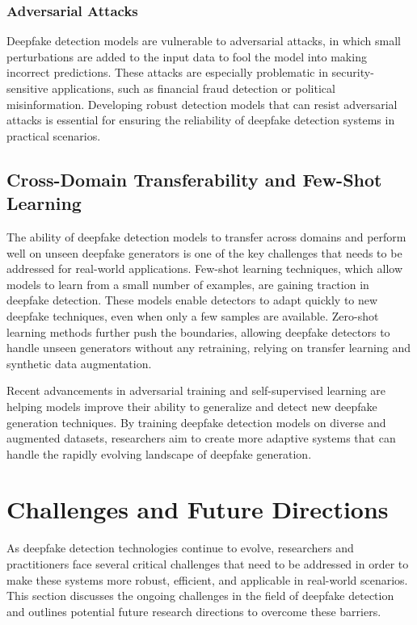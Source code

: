 \documentclass[lettersize,journal]{IEEEtran}
\begin{document}
\subsubsection{Adversarial Attacks}

Deepfake detection models are vulnerable to adversarial attacks, in which small perturbations are added to the input data to fool the model into making incorrect predictions. These attacks are especially problematic in security-sensitive applications, such as financial fraud detection or political misinformation. Developing robust detection models that can resist adversarial attacks is essential for ensuring the reliability of deepfake detection systems in practical scenarios.


\subsection{Cross-Domain Transferability and Few-Shot Learning}

The ability of deepfake detection models to transfer across domains and perform well on unseen deepfake generators is one of the key challenges that needs to be addressed for real-world applications. Few-shot learning techniques, which allow models to learn from a small number of examples, are gaining traction in deepfake detection. These models enable detectors to adapt quickly to new deepfake techniques, even when only a few samples are available. Zero-shot learning methods further push the boundaries, allowing deepfake detectors to handle unseen generators without any retraining, relying on transfer learning and synthetic data augmentation.

Recent advancements in adversarial training and self-supervised learning are helping models improve their ability to generalize and detect new deepfake generation techniques. By training deepfake detection models on diverse and augmented datasets, researchers aim to create more adaptive systems that can handle the rapidly evolving landscape of deepfake generation.\cite{muthukumar2024fake}

\section{Challenges and Future Directions}

\noindent As deepfake detection technologies continue to evolve, researchers and practitioners face several critical challenges that need to be addressed in order to make these systems more robust, efficient, and applicable in real-world scenarios. This section discusses the ongoing challenges in the field of deepfake detection and outlines potential future research directions to overcome these barriers.\cite{sharma2025robust}
\end{document}
